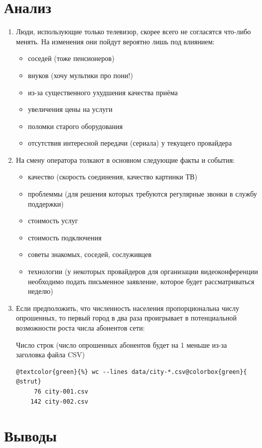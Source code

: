 \documentclass[unicode, 12pt, a4paper,oneside,fleqn]{article}
\begin{document}
\section{Анализ}
\begin{enumerate}
\item Люди, использующие только телевизор, скорее всего не согласятся
  что-либо менять. На изменения они пойдут вероятно лишь под влиянием:
  \begin{itemize}
  \item соседей (тоже пенсионеров)
  \item внуков (хочу мультики про пони!)
  \item из-за существенного ухудшения качества приёма
  \item увеличения цены на услуги
  \item поломки старого оборудования
  \item отсутствия интересной передачи (сериала) у текущего провайдера
  \end{itemize}
\item На смену оператора толкают в основном следующие факты и события:
  \begin{itemize}
  \item качество (скорость соединения, качество картинки ТВ)
  \item проблеммы (для решения которых требуются регулярные звонки в
    службу поддержки)
  \item стоимость услуг
  \item стоимость подключения
  \item советы знакомых, соседей, сослуживцев
  \item технологии (у некоторых провайдеров для организации
    видеоконференции необходимо подать письменное заявление, которое
    будет рассматриваться неделю)
  \end{itemize}
\item Если предположить, что численность населения пропорциональна
  числу опрошенных, то первый город в два раза проигрывает в
  потенциальной возможности роста числа абонентов сети:

  Число строк (число опрошенных абонентов будет на 1 меньше из-за
  заголовка файла CSV)
  \begin{Verbatim}[commandchars=@\{\}]
    @textcolor{green}{%} wc --lines data/city-*.csv@colorbox{green}{ @strut}
     76 city-001.csv
    142 city-002.csv
  \end{Verbatim}
\end{enumerate}
\section{Выводы}
\end{document}
